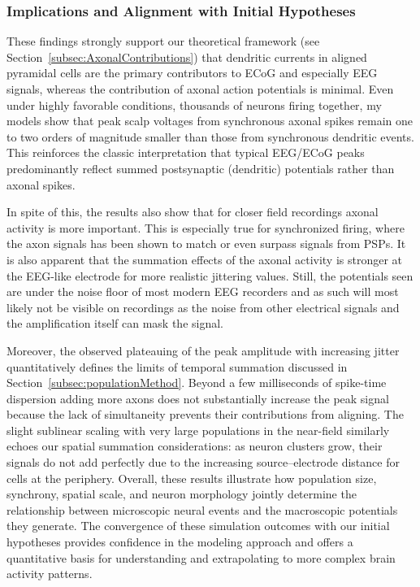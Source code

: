 \documentclass[final, a4paper,masters,en,listoffigures,listoftables,norwegiandates]{NMBU}
\begin{document}
\subsubsection{Implications and Alignment with Initial Hypotheses}
These findings strongly support our theoretical framework (see Section~\ref{subsec:AxonalContributions}) that dendritic currents in aligned pyramidal cells are the primary contributors to ECoG and especially EEG signals, whereas the contribution of axonal action potentials is minimal. Even under highly favorable conditions, thousands of neurons firing together, my models show that peak scalp voltages from synchronous axonal spikes remain one to two orders of magnitude smaller than those from synchronous dendritic events. This reinforces the classic interpretation that typical EEG/ECoG peaks predominantly reflect summed postsynaptic (dendritic) potentials rather than axonal spikes.

In spite of this, the results also show that for closer field recordings axonal activity is more important. This is especially true for synchronized firing, where the axon signals has been shown to match or even surpass signals from PSPs. It is also apparent that the summation effects of the axonal activity is stronger at the EEG-like electrode for more realistic jittering values. Still, the potentials seen are under the noise floor of most modern EEG recorders and as such will most likely not be visible on recordings as the noise from other electrical signals and the amplification itself can mask the signal.

Moreover, the observed plateauing of the peak amplitude with increasing jitter quantitatively defines the limits of temporal summation discussed in Section~\ref{subsec:populationMethod}. Beyond a few milliseconds of spike-time dispersion adding more axons does not substantially increase the peak signal because the lack of simultaneity prevents their contributions from aligning. The slight sublinear scaling with very large populations in the near-field similarly echoes our spatial summation considerations: as neuron clusters grow, their signals do not add perfectly due to the increasing source–electrode distance for cells at the periphery. Overall, these results illustrate how population size, synchrony, spatial scale, and neuron morphology jointly determine the relationship between microscopic neural events and the macroscopic potentials they generate. The convergence of these simulation outcomes with our initial hypotheses provides confidence in the modeling approach and offers a quantitative basis for understanding and extrapolating to more complex brain activity patterns.
\end{document}
